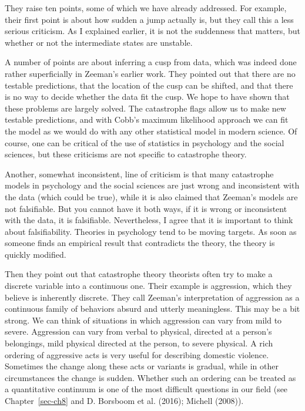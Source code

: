 \documentclass[
  a4paper,
  DIV=11,
  numbers=noendperiod,
  oneside]{scrreprt}
\begin{document}
They raise ten points, some of which we have already addressed. For
example, their first point is about how sudden a jump actually is, but
they call this a less serious criticism. As I explained earlier, it is
not the suddenness that matters, but whether or not the intermediate
states are unstable.

A number of points are about inferring a cusp from data, which was
indeed done rather superficially in Zeeman's earlier work. They pointed
out that there are no testable predictions, that the location of the
cusp can be shifted, and that there is no way to decide whether the data
fit the cusp. We hope to have shown that these problems are largely
solved. The catastrophe flags allow us to make new testable predictions,
and with Cobb's maximum likelihood approach we can fit the model as we
would do with any other statistical model in modern science. Of course,
one can be critical of the use of statistics in psychology and the
social sciences, but these criticisms are not specific to catastrophe
theory.

Another, somewhat inconsistent, line of criticism is that many
catastrophe models in psychology and the social sciences are just wrong
and inconsistent with the data (which could be true), while it is also
claimed that Zeeman's models are not falsifiable. But you cannot have it
both ways, if it is wrong or inconsistent with the data, it is
falsifiable. Nevertheless, I agree that it is important to think about
falsifiability. Theories in psychology tend to be moving targets. As
soon as someone finds an empirical result that contradicts the theory,
the theory is quickly modified.

Then they point out that catastrophe theory theorists often try to make
a discrete variable into a continuous one. Their example is aggression,
which they believe is inherently discrete. They call Zeeman's
interpretation of aggression as a continuous family of behaviors absurd
and utterly meaningless. This may be a bit strong. We can think of
situations in which aggression can vary from mild to severe. Aggression
can vary from verbal to physical, directed at a person's belongings,
mild physical directed at the person, to severe physical. A rich
ordering of aggressive acts is very useful for describing domestic
violence. Sometimes the change along these acts or variants is gradual,
while in other circumstances the change is sudden. Whether such an
ordering can be treated as a quantitative continuum is one of the most
difficult questions in our field (see Chapter~\ref{sec-ch8} and D.
Borsboom et al. (2016); Michell (2008)).
\end{document}
